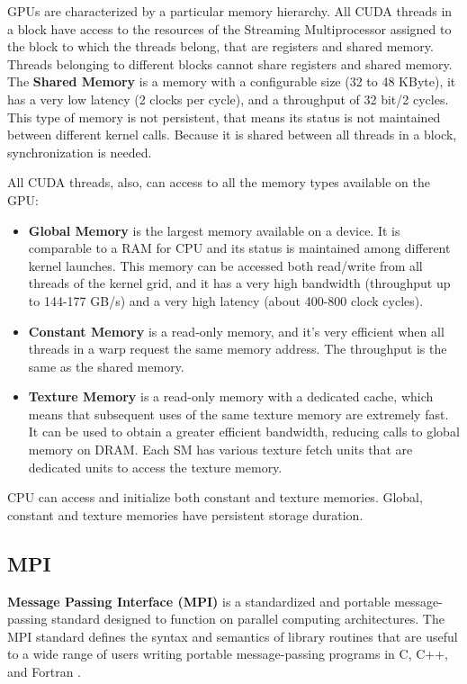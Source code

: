 GPUs are characterized by a particular memory hierarchy.
All CUDA threads in a block have access to the resources of the Streaming Multiprocessor assigned to the block to which the threads belong, that are registers and shared memory.
Threads belonging to different blocks cannot share registers and shared memory. The \textbf{Shared Memory} is a memory with a configurable size (32 to 48 KByte), it has a very low latency (2 clocks per cycle), and a throughput of 32 bit/2 cycles.
This type of memory is not persistent, that means its status is not maintained between different kernel calls.
Because it is shared between all threads in a block, synchronization is needed.

All CUDA threads, also, can access to all the memory types available on the GPU:
\begin{itemize}
    \item \textbf{Global Memory} is the largest memory available on a device. It is comparable to a RAM for CPU and its status is maintained among different kernel launches. This memory can be accessed both read/write from all threads of the kernel grid, and it has a very high bandwidth (throughput up to 144-177 GB/s) and a very high latency (about 400-800 clock cycles).
    \item \textbf{Constant Memory} is a read-only memory, and it's very efficient when all threads in a warp request the same memory address. The throughput is the same as the shared memory.
    \item \textbf{Texture Memory} is a read-only memory with a dedicated cache, which means that subsequent uses of the same texture memory are extremely fast. It can be used to obtain a greater efficient bandwidth, reducing calls to global memory on DRAM. Each SM has various texture fetch units that are dedicated units to access the texture memory.
\end{itemize}
CPU can access and initialize both constant and texture memories. Global, constant and texture memories have persistent storage duration.

\subsection{MPI}
\textbf{Message Passing Interface (MPI)} is a standardized and portable message-passing standard designed to function on parallel computing architectures.
The MPI standard defines the syntax and semantics of library routines that are useful to a wide range of users writing portable message-passing programs in C, C++, and Fortran \cite{wiki:MPI}.

